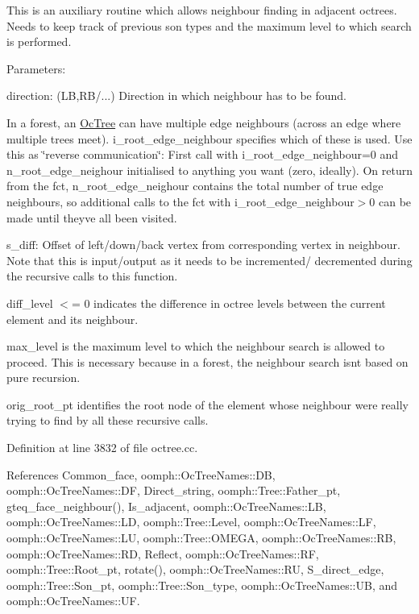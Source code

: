 This is an auxiliary routine which allows neighbour finding in adjacent octrees. Needs to keep track of previous son types and the maximum level to which search is performed.

Parameters\+:


\begin{DoxyItemize}
\item direction\+: (LB,R\+B/...) Direction in which neighbour has to be found.
\item In a forest, an \hyperlink{classoomph_1_1OcTree}{Oc\+Tree} can have multiple edge neighbours (across an edge where multiple trees meet). {\ttfamily i\+\_\+root\+\_\+edge\+\_\+neighbour} specifies which of these is used. Use this as \char`\"{}reverse communication\char`\"{}\+: First call with {\ttfamily i\+\_\+root\+\_\+edge\+\_\+neighbour=0} and {\ttfamily n\+\_\+root\+\_\+edge\+\_\+neighour} initialised to anything you want (zero, ideally). On return from the fct, {\ttfamily n\+\_\+root\+\_\+edge\+\_\+neighour} contains the total number of true edge neighbours, so additional calls to the fct with {\ttfamily i\+\_\+root\+\_\+edge\+\_\+neighbour$>$0} can be made until they\textquotesingle{}ve all been visited.
\item s\+\_\+diff\+: Offset of left/down/back vertex from corresponding vertex in neighbour. Note that this is input/output as it needs to be incremented/ decremented during the recursive calls to this function.
\item diff\+\_\+level $<$= 0 indicates the difference in octree levels between the current element and its neighbour.
\item max\+\_\+level is the maximum level to which the neighbour search is allowed to proceed. This is necessary because in a forest, the neighbour search isn\textquotesingle{}t based on pure recursion.
\item orig\+\_\+root\+\_\+pt identifies the root node of the element whose neighbour we\textquotesingle{}re really trying to find by all these recursive calls. 
\end{DoxyItemize}

Definition at line 3832 of file octree.\+cc.



References Common\+\_\+face, oomph\+::\+Oc\+Tree\+Names\+::\+DB, oomph\+::\+Oc\+Tree\+Names\+::\+DF, Direct\+\_\+string, oomph\+::\+Tree\+::\+Father\+\_\+pt, gteq\+\_\+face\+\_\+neighbour(), Is\+\_\+adjacent, oomph\+::\+Oc\+Tree\+Names\+::\+LB, oomph\+::\+Oc\+Tree\+Names\+::\+LD, oomph\+::\+Tree\+::\+Level, oomph\+::\+Oc\+Tree\+Names\+::\+LF, oomph\+::\+Oc\+Tree\+Names\+::\+LU, oomph\+::\+Tree\+::\+O\+M\+E\+GA, oomph\+::\+Oc\+Tree\+Names\+::\+RB, oomph\+::\+Oc\+Tree\+Names\+::\+RD, Reflect, oomph\+::\+Oc\+Tree\+Names\+::\+RF, oomph\+::\+Tree\+::\+Root\+\_\+pt, rotate(), oomph\+::\+Oc\+Tree\+Names\+::\+RU, S\+\_\+direct\+\_\+edge, oomph\+::\+Tree\+::\+Son\+\_\+pt, oomph\+::\+Tree\+::\+Son\+\_\+type, oomph\+::\+Oc\+Tree\+Names\+::\+UB, and oomph\+::\+Oc\+Tree\+Names\+::\+UF.



